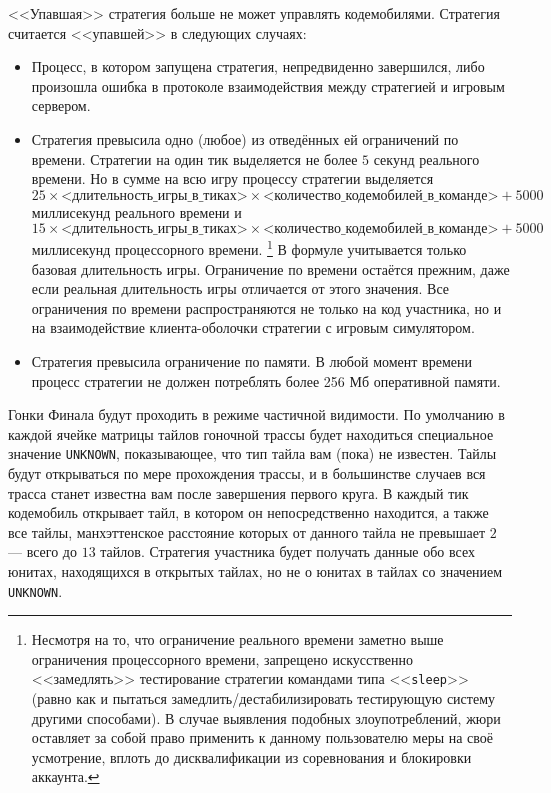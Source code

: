 <<Упавшая>> стратегия больше не может управлять кодемобилями. Стратегия считается <<упавшей>> в следующих случаях:
\begin{itemize}
  \item Процесс, в котором запущена стратегия, непредвиденно завершился, либо произошла ошибка в протоколе взаимодействия между стратегией
        и игровым сервером.
  \item Стратегия превысила одно (любое) из отведённых ей ограничений по времени. Стратегии на один тик выделяется не более $5$ секунд
        реального времени. Но в сумме на всю игру процессу стратегии выделяется
        \begin{equation}
        25\times\textit{<длительность\_игры\_в\_тиках>}\times\textit{<количество\_кодемобилей\_в\_команде>}+5000
        \end{equation}
        миллисекунд реального времени и
        \begin{equation}
        15\times\textit{<длительность\_игры\_в\_тиках>}\times\textit{<количество\_кодемобилей\_в\_команде>}+5000
        \end{equation}
        миллисекунд процессорного времени. \footnote[1]{Несмотря на то, что ограничение реального времени заметно выше ограничения
        процессорного времени, запрещено искусственно <<замедлять>> тестирование стратегии командами типа <<\texttt{sleep}>> (равно как и
        пытаться замедлить/дестабилизировать тестирующую систему другими способами). В случае выявления подобных злоупотреблений, жюри
        оставляет за собой право применить к данному пользователю меры на своё усмотрение, вплоть до дисквалификации из соревнования и
        блокировки аккаунта.} В формуле учитывается только базовая длительность игры. Ограничение по времени остаётся прежним, даже если
        реальная длительность игры отличается от этого значения. Все ограничения по времени распространяются не только на код участника, но
        и на взаимодействие клиента-оболочки стратегии с игровым симулятором.
  \item Стратегия превысила ограничение по памяти. В любой момент времени процесс стратегии не должен потреблять более 256 Мб оперативной
        памяти.
\end{itemize}

Гонки Финала будут проходить в режиме частичной видимости. По умолчанию в каждой ячейке матрицы тайлов гоночной трассы будет находиться
специальное значение \texttt{UNKNOWN}, показывающее, что тип тайла вам (пока) не известен. Тайлы будут открываться по мере прохождения
трассы, и в большинстве случаев вся трасса станет известна вам после завершения первого круга. В каждый тик кодемобиль открывает тайл, в
котором он непосредственно находится, а также все тайлы, манхэттенское расстояние которых от данного тайла не превышает $2$ --- всего до
$13$ тайлов. Стратегия участника будет получать данные обо всех юнитах, находящихся в открытых тайлах, но не о юнитах в тайлах со значением
\texttt{UNKNOWN}.

